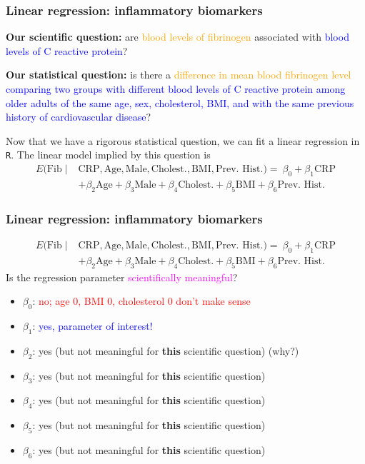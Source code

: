 \documentclass[12pt, 
hyperref={colorlinks=true, linkcolor=blue, urlcolor=cyan},dvipsnames]{beamer}
\begin{document}
\begin{frame}
\frametitle{Linear regression: inflammatory biomarkers}
\textbf{Our scientific question:} are \textcolor{orange}{blood levels of fibrinogen} associated with \textcolor{blue}{blood levels of C reactive protein}?

\textbf{Our statistical question:} is there a \textcolor{orange}{difference in mean blood fibrinogen level} \textcolor{blue}{comparing two groups with different blood levels of C reactive protein among older adults of the same age, sex, cholesterol, BMI, and with the same previous history of cardiovascular disease}?

Now that we have a rigorous statistical question, we can fit a linear regression in \texttt{R}. The linear model implied by this question is
\begin{align*}
E(\text{Fib} \mid & \text{CRP}, \text{Age}, \text{Male}, \text{Cholest.}, \text{BMI}, \text{Prev. Hist.}) =  \ \beta_0 + \beta_1 \text{CRP} \\
&+ \beta_2 \text{Age}  + \beta_3 \text{Male} + \beta_4 \text{Cholest.} + \beta_5 \text{BMI} + \beta_6 \text{Prev. Hist.}
\end{align*}
\end{frame}

\begin{frame}
\frametitle{Linear regression: inflammatory biomarkers}
{\small 
\begin{align*}
E(\text{Fib} \mid & \text{CRP}, \text{Age}, \text{Male}, \text{Cholest.}, \text{BMI}, \text{Prev. Hist.}) =  \ \beta_0 + \beta_1 \text{CRP} \\
&+ \beta_2 \text{Age}  + \beta_3 \text{Male} + \beta_4 \text{Cholest.} + \beta_5 \text{BMI} + \beta_6 \text{Prev. Hist.}
\end{align*}
}
Is the regression parameter \textcolor{magenta}{scientifically meaningful}? \vspace{-0.3cm}
\begin{itemize}
\item $\beta_0$: \pause \textcolor{red}{no; age 0, BMI 0, cholesterol 0 don't make sense}
\item $\beta_1$: \pause \textcolor{blue}{yes, parameter of interest!}
\item $\beta_2$: \pause yes (but not meaningful for \textbf{this} scientific question) (why?)
\item $\beta_3$: yes (but not meaningful for \textbf{this} scientific question)
\item $\beta_4$: yes (but not meaningful for \textbf{this} scientific question)
\item $\beta_5$: yes (but not meaningful for \textbf{this} scientific question)
\item $\beta_6$: yes (but not meaningful for \textbf{this} scientific question)
\end{itemize} 

\end{frame}
\end{document}
